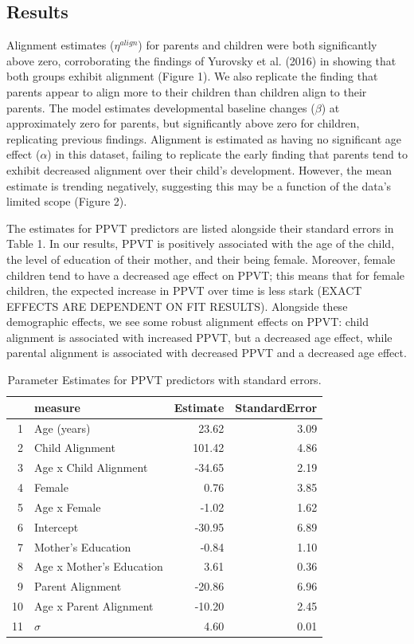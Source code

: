 \documentclass[10pt, letterpaper]{article}
\begin{document}
\hypertarget{results}{%
\subsection{Results}\label{results}}

Alignment estimates (\(\eta^{align}\)) for parents and children were
both significantly above zero, corroborating the findings of Yurovsky et
al. (2016) in showing that both groups exhibit alignment (Figure 1). We
also replicate the finding that parents appear to align more to their
children than children align to their parents. The model estimates
developmental baseline changes (\(\beta\)) at approximately zero for
parents, but significantly above zero for children, replicating previous
findings. Alignment is estimated as having no significant age effect
(\(\alpha\)) in this dataset, failing to replicate the early finding
that parents tend to exhibit decreased alignment over their child's
development. However, the mean estimate is trending negatively,
suggesting this may be a function of the data's limited scope (Figure
2).

The estimates for PPVT predictors are listed alongside their standard
errors in Table 1. In our results, PPVT is positively associated with
the age of the child, the level of education of their mother, and their
being female. Moreover, female children tend to have a decreased age
effect on PPVT; this means that for female children, the expected
increase in PPVT over time is less stark (EXACT EFFECTS ARE DEPENDENT ON
FIT RESULTS). Alongside these demographic effects, we see some robust
alignment effects on PPVT: child alignment is associated with increased
PPVT, but a decreased age effect, while parental alignment is associated
with decreased PPVT and a decreased age effect.

\begin{table}[H]
\centering
\begin{tabular}{rlrr}
  \hline
 & measure & Estimate & StandardError \\ 
  \hline
1 & Age (years) & 23.62 & 3.09 \\ 
  2 & Child Alignment & 101.42 & 4.86 \\ 
  3 & Age x Child Alignment & -34.65 & 2.19 \\ 
  4 & Female & 0.76 & 3.85 \\ 
  5 & Age x Female & -1.02 & 1.62 \\ 
  6 & Intercept & -30.95 & 6.89 \\ 
  7 & Mother's Education & -0.84 & 1.10 \\ 
  8 & Age x Mother's Education & 3.61 & 0.36 \\ 
  9 & Parent Alignment & -20.86 & 6.96 \\ 
  10 & Age x Parent Alignment & -10.20 & 2.45 \\ 
  11 & $\sigma$ & 4.60 & 0.01 \\ 
   \hline
\end{tabular}
\caption{Parameter Estimates for PPVT predictors with standard errors.} 
\end{table}
\end{document}
